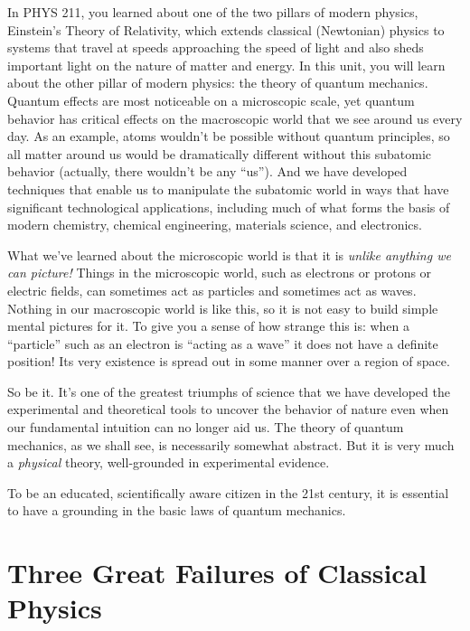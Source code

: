 In PHYS 211, you learned about one of the two pillars of modern physics,
Einstein's Theory of Relativity, which extends classical (Newtonian)
physics to systems that travel at speeds approaching the speed of light
and also sheds important light on the nature of matter and energy.
In this unit, you will learn about the other pillar of modern physics:
the theory of quantum mechanics.  Quantum effects are most noticeable on
a microscopic scale, yet quantum behavior has critical effects on
the macroscopic world that we see around us every day. As an example,
atoms wouldn't be possible without quantum principles, so all matter
around us would be dramatically different without this subatomic
behavior (actually, there wouldn't be any ``us'').  And we have developed
techniques that enable us to manipulate the subatomic world in ways that
have significant technological applications, including much of what forms
the basis of modern chemistry, chemical engineering, materials science,
and electronics.

What we've learned about the microscopic world is that it is {\it
  unlike anything we can picture!}  Things in the microscopic world,
such as electrons or protons or electric fields, can sometimes act as
particles and sometimes act as waves.  
Nothing in our macroscopic world is like this, so it is not easy
to build simple mental pictures for it.  To give you a sense of how
strange this is: when a ``particle'' such as an electron is ``acting
as a wave'' it does not have a definite position!  Its very existence
is spread out in some manner over a region of space.

So be it.  It's one of the greatest triumphs of science that we have
developed the experimental and theoretical tools to uncover the
behavior of nature even when our fundamental intuition can no longer
aid us.  The theory of quantum mechanics, as we shall see, is
necessarily somewhat abstract.  But it is very much a {\it physical}
theory, well-grounded in experimental evidence.


To be an educated,
scientifically aware citizen in the 21st century, it is essential to
have a grounding in the basic laws of quantum mechanics.

\section{Three Great Failures of Classical Physics}

